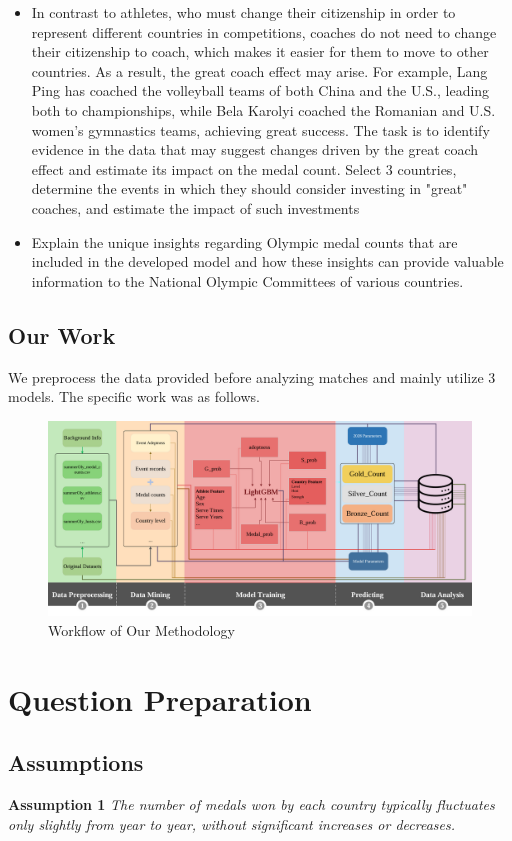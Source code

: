 \documentclass[12pt]{article}  %
\begin{document}
\begin{itemize}
	
	\item In contrast to athletes, who must change their citizenship in order to represent different countries in competitions, coaches do not need to change their citizenship to coach, which makes it easier for them to move to other countries. As a result, the great coach effect may arise. For example, Lang Ping has coached the volleyball teams of both China and the U.S., leading both to championships, while Bela Karolyi coached the Romanian and U.S. women’s gymnastics teams, achieving great success. The task is to identify evidence in the data that may suggest changes driven by the great coach effect and estimate its impact on the medal count. Select 3 countries, determine the events in which they should consider investing in "great" coaches, and estimate the impact of such investments
	\item Explain the unique insights regarding Olympic medal counts that are included in the developed model and how these insights can provide valuable information to the National Olympic Committees of various countries.

\end{itemize}

\subsection{Our Work}
We preprocess the data provided before analyzing matches and mainly utilize 3 models. The specific work was as follows.
\begin{figure}[H]
	\centering
	\includegraphics[width=16cm]{img/da.png}
	\caption{Workflow of Our Methodology}
	\label{fig:aa}
\end{figure}


\section{Question Preparation}
\subsection{Assumptions}
\textbf{Assumption 1 } \textit{The number of medals won by each country typically fluctuates only slightly from year to year, without significant increases or decreases.}
\end{document}

